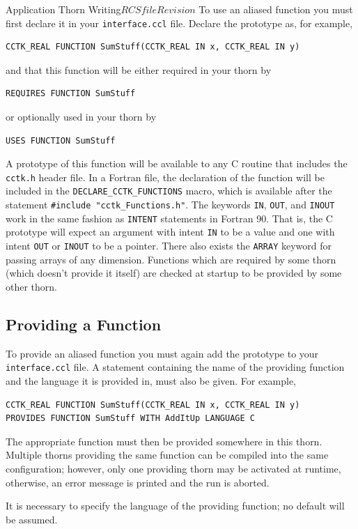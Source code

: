 \begin{cactuspart}{Application Thorn Writing}{$RCSfile$}{$Revision$}
To use an aliased function you must first declare it in your 
\texttt{interface.ccl} file. Declare the prototype as, for example,
\begin{verbatim}
CCTK_REAL FUNCTION SumStuff(CCTK_REAL IN x, CCTK_REAL IN y)
\end{verbatim}
\noindent and that this function will be either required in your thorn by
\begin{verbatim}
REQUIRES FUNCTION SumStuff
\end{verbatim}
\noindent or optionally used in your thorn by
\begin{verbatim}
USES FUNCTION SumStuff
\end{verbatim}
A prototype of this function will be available to any C routine that
includes the \texttt{cctk.h} header file.
In a Fortran file, the declaration of the function will be included
in the \texttt{DECLARE\_CCTK\_FUNCTIONS} macro, which is available after
the statement \texttt{\#include "cctk\_Functions.h"}.
The keywords \texttt{IN}, \texttt{OUT}, and \texttt{INOUT}
work in the same fashion as \texttt{INTENT} statements in Fortran 90.
That is, the C prototype will expect an argument with intent \texttt{IN}
to be a value and one with intent \texttt{OUT} or \texttt{INOUT} to be a
pointer. There also exists the \texttt{ARRAY} keyword for passing arrays
of any dimension.
Functions which are required by some thorn (which doesn't provide it itself)
are checked at startup to be provided by some other thorn.


\subsection{Providing a Function}

To provide an aliased function you must again add the prototype to
your \texttt{interface.ccl} file. A statement containing the name of the
providing function and the language it is provided in, must also be
given. For example,
\begin{verbatim}
CCTK_REAL FUNCTION SumStuff(CCTK_REAL IN x, CCTK_REAL IN y)
PROVIDES FUNCTION SumStuff WITH AddItUp LANGUAGE C
\end{verbatim}
The appropriate function must then be provided somewhere in this
thorn. Multiple thorns providing the same function can be compiled into the
same configuration; however, only one providing thorn may be activated at
runtime, otherwise, an error message is printed and the run is aborted.

It is necessary to specify the language of the providing function; no
default will be assumed.



\end{cactuspart}

